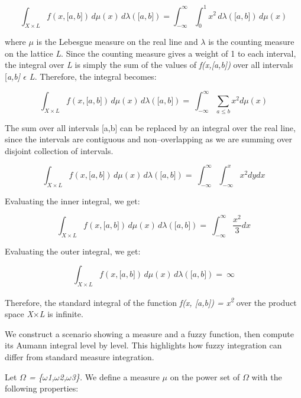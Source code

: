 \documentclass[12pt,a4paper]{report}
\numberwithin{equation}{section}
\begin{document}
\[\int_{X \times L}^{}{f\left( x,\lbrack a,b\rbrack \right)}\, d\mu(x)\, d\lambda\left( \lbrack a,b\rbrack \right) = \int_{- \infty}^{\infty}{\int_{0}^{1}x^{2}}\, d\lambda\left( \lbrack a,b\rbrack \right)\, d\mu(x)\]

where $\mu$ is the Lebesgue measure on the real line and \emph{$\lambda$} is the
counting measure on the lattice \emph{L}. Since the counting measure
gives a weight of 1 to each interval, the integral over \emph{L} is
simply the sum of the values of \emph{f(x,{[}a,b{]})} over all intervals
{[}\emph{a,b{]} $\epsilon$ L}. Therefore, the integral becomes:


\[\int_{X \times L}^{}{f\left( x,\lbrack a,b\rbrack \right)}\, d\mu(x)\, d\lambda\left( \lbrack a,b\rbrack \right) = \ \int_{-\infty}^{\infty}{\sum_{a \leq b}^{}{x^{2}d\mu(x)}}\]

The sum over all intervals {[}a,b{]} can be replaced by an integral over
the real line, since the intervals are contiguous and non--overlapping as
we are summing over disjoint collection of intervals.


\[\int_{X \times L}^{}{f\left( x,\lbrack a,b\rbrack \right)}\, d\mu(x)\, d\lambda\left( \lbrack a,b\rbrack \right) = \ \int_{- \infty}^{\infty}{\int_{- \infty}^{x}{x^{2}dydx}}\]

Evaluating the inner integral, we get:


\[\int_{X \times L}^{}{f\left( x,\lbrack a,b\rbrack \right)}\, d\mu(x)\, d\lambda\left( \lbrack a,b\rbrack \right) = \ \int_{-\infty}^{\infty}{\frac{x^{2}}{3}dx}\]

Evaluating the outer integral, we get:

\[\int_{X \times L}^{}{f\left( x,\lbrack a,b\rbrack \right)}\, d\mu(x)\, d\lambda\left( \lbrack a,b\rbrack \right) = \ \infty\]

Therefore, the standard integral of the function \emph{f(x, {[}a,b{]}) =
x\textsuperscript{2}} over the product space \emph{X$\times$L} is infinite.

We construct a scenario showing a measure and a fuzzy
function, then compute its Aumann integral level by level. This
highlights how fuzzy integration can differ from standard measure
integration.

Let \emph{$\Omega$ = \{$\omega$1,$\omega$2,$\omega$3\}.} We define a  measure \emph{$\mu$}
on the power set of \emph{$\Omega$} with the following properties:
\end{document}
